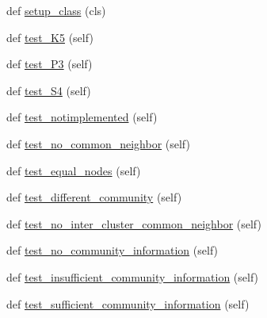 \begin{DoxyCompactItemize}
\item 
def \hyperlink{classnetworkx_1_1algorithms_1_1tests_1_1test__link__prediction_1_1TestWithinInterCluster_a472012115bdd18f3fa8d250c8dc58559}{setup\+\_\+class} (cls)
\item 
def \hyperlink{classnetworkx_1_1algorithms_1_1tests_1_1test__link__prediction_1_1TestWithinInterCluster_a1d0bd1290f6729c742a6464b954028e2}{test\+\_\+\+K5} (self)
\item 
def \hyperlink{classnetworkx_1_1algorithms_1_1tests_1_1test__link__prediction_1_1TestWithinInterCluster_adb2c58f083000fe9aaacb6b390cf415d}{test\+\_\+\+P3} (self)
\item 
def \hyperlink{classnetworkx_1_1algorithms_1_1tests_1_1test__link__prediction_1_1TestWithinInterCluster_abebed3d58d2be2d9d9537cb45d53a85d}{test\+\_\+\+S4} (self)
\item 
def \hyperlink{classnetworkx_1_1algorithms_1_1tests_1_1test__link__prediction_1_1TestWithinInterCluster_a43e1afcf9ec5b9126d1498e146c28e0a}{test\+\_\+notimplemented} (self)
\item 
def \hyperlink{classnetworkx_1_1algorithms_1_1tests_1_1test__link__prediction_1_1TestWithinInterCluster_a85146a24ddfe6bc76c34146b12ec8334}{test\+\_\+no\+\_\+common\+\_\+neighbor} (self)
\item 
def \hyperlink{classnetworkx_1_1algorithms_1_1tests_1_1test__link__prediction_1_1TestWithinInterCluster_abb3d987b8c76662e71ef4bfc7e1d4681}{test\+\_\+equal\+\_\+nodes} (self)
\item 
def \hyperlink{classnetworkx_1_1algorithms_1_1tests_1_1test__link__prediction_1_1TestWithinInterCluster_a6a526de8ee1be5d8fd6798f77829b381}{test\+\_\+different\+\_\+community} (self)
\item 
def \hyperlink{classnetworkx_1_1algorithms_1_1tests_1_1test__link__prediction_1_1TestWithinInterCluster_a572a825025c714b546404670006266f9}{test\+\_\+no\+\_\+inter\+\_\+cluster\+\_\+common\+\_\+neighbor} (self)
\item 
def \hyperlink{classnetworkx_1_1algorithms_1_1tests_1_1test__link__prediction_1_1TestWithinInterCluster_a5a0efae322c703b441afc403bcd41880}{test\+\_\+no\+\_\+community\+\_\+information} (self)
\item 
def \hyperlink{classnetworkx_1_1algorithms_1_1tests_1_1test__link__prediction_1_1TestWithinInterCluster_a35e4bb189dbc928e1eaa341ff1dc4d77}{test\+\_\+insufficient\+\_\+community\+\_\+information} (self)
\item 
def \hyperlink{classnetworkx_1_1algorithms_1_1tests_1_1test__link__prediction_1_1TestWithinInterCluster_a99da35638c920b00d9e0a8fbeb183460}{test\+\_\+sufficient\+\_\+community\+\_\+information} (self)

\end{DoxyCompactItemize}
